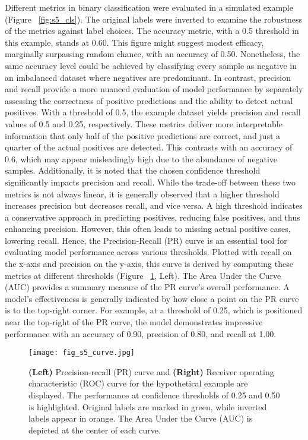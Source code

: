 Different metrics in binary classification were evaluated in a simulated example (Figure ~\ref{fig:s5_cls}). The original labels were inverted to examine the robustness of the metrics against label choices. The accuracy metric, with a 0.5 threshold in this example, stands at 0.60. This figure might suggest modest efficacy, marginally surpassing random chance, with an accuracy of 0.50. Nonetheless, the same accuracy level could be achieved by classifying every sample as negative in an imbalanced dataset where negatives are predominant. In contrast, precision and recall provide a more nuanced evaluation of model performance by separately assessing the correctness of positive predictions and the ability to detect actual positives. With a threshold of 0.5, the example dataset yields precision and recall values of 0.5 and 0.25, respectively. These metrics deliver more interpretable information that only half of the positive predictions are correct, and just a quarter of the actual positives are detected. This contrasts with an accuracy of 0.6, which may appear misleadingly high due to the abundance of negative samples.
Additionally, it is noted that the chosen confidence threshold significantly impacts precision and recall. While the trade-off between these two metrics is not always linear, it is generally observed that a higher threshold increases precision but decreases recall, and vice versa. A high threshold indicates a conservative approach in predicting positives, reducing false positives, and thus enhancing precision. However, this often leads to missing actual positive cases, lowering recall. Hence, the Precision-Recall (PR) curve is an essential tool for evaluating model performance across various thresholds. Plotted with recall on the x-axis and precision on the y-axis, this curve is derived by computing these metrics at different thresholds (Figure ~\ref{fig:s5_curve}, Left). The Area Under the Curve (AUC) provides a summary measure of the PR curve's overall performance. A model's effectiveness is generally indicated by how close a point on the PR curve is to the top-right corner. For example, at a threshold of 0.25, which is positioned near the top-right of the PR curve, the model demonstrates impressive performance with an accuracy of 0.90, precision of 0.80, and recall at 1.00.

\begin{figure}[h]
    \centering
    \texttt{[image: fig\_s5\_curve.jpg]}
    \caption{\textbf{(Left)} Precision-recall (PR) curve and \textbf{(Right)} Receiver operating characteristic (ROC) curve for the hypothetical example are displayed. The performance at confidence thresholds of 0.25 and 0.50 is highlighted. Original labels are marked in green, while inverted labels appear in orange. The Area Under the Curve (AUC) is depicted at the center of each curve.}
    \label{fig:s5_curve}
\end{figure}

